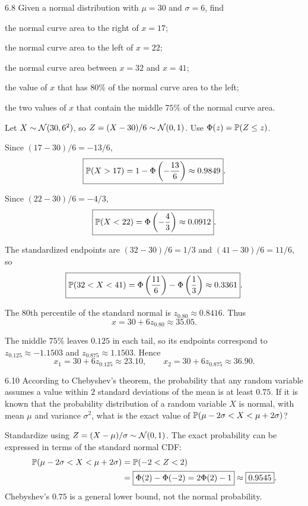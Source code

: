 \documentclass[11pt,oneside]{article}
\begin{document}
\begin{exercise}{6.8}
Given a normal distribution with $\mu=30$ and $\sigma=6$, find
\begin{exercisesubparts}
\item the normal curve area to the right of $x=17$;
\item the normal curve area to the left of $x=22$;
\item the normal curve area between $x=32$ and $x=41$;
\item the value of $x$ that has $80\%$ of the normal curve area to the left;
\item the two values of $x$ that contain the middle $75\%$ of the normal curve area.
\end{exercisesubparts}
\end{exercise}
\begin{solution}
Let $X\sim\mathcal{N}(30,6^2)$, so $Z=(X-30)/6\sim\mathcal{N}(0,1)$. Use $\Phi(z)=\mathbb{P}(Z\le z)$.
\begin{exercisesubparts}
\item Since $(17-30)/6=-13/6$,
\[
\boxed{\mathbb{P}(X>17)=1-\Phi\left(-\frac{13}{6}\right)\approx0.9849}.
\]
\item Since $(22-30)/6=-4/3$,
\[
\boxed{\mathbb{P}(X<22)=\Phi\left(-\frac43\right)\approx0.0912}.
\]
\item The standardized endpoints are $(32-30)/6=1/3$ and $(41-30)/6=11/6$, so
\[
\boxed{\mathbb{P}(32<X<41)=\Phi\left(\frac{11}{6}\right)-\Phi\left(\frac13\right)\approx0.3361}.
\]
\item The $80$th percentile of the standard normal is $z_{0.80}\approx0.8416$. Thus
\[
\boxed{x=30+6z_{0.80}\approx35.05}.
\]
\item The middle $75\%$ leaves $0.125$ in each tail, so its endpoints correspond to $z_{0.125}\approx-1.1503$ and $z_{0.875}\approx1.1503$. Hence
\[
\boxed{x_1=30+6z_{0.125}\approx23.10},\qquad
\boxed{x_2=30+6z_{0.875}\approx36.90}.
\]
\end{exercisesubparts}
\end{solution}

\begin{exercise}{6.10}
According to Chebyshev's theorem, the probability that any random variable assumes a value within $2$ standard deviations of the mean is at least $0.75$. If it is known that the probability distribution of a random variable $X$ is normal, with mean $\mu$ and variance $\sigma^2$, what is the exact value of $\mathbb{P}(\mu-2\sigma<X<\mu+2\sigma)$?
\end{exercise}
\begin{solution}
Standardize using $Z=(X-\mu)/\sigma\sim\mathcal{N}(0,1)$. The exact probability can be expressed in terms of the standard normal CDF:
\[
\begin{aligned}
\mathbb{P}(\mu-2\sigma<X<\mu+2\sigma)
 &=\mathbb{P}(-2<Z<2)\\
 &=\boxed{\Phi(2)-\Phi(-2)=2\Phi(2)-1}\approx\boxed{0.9545}.
\end{aligned}
\]
Chebyshev's $0.75$ is a general lower bound, not the normal probability.
\end{solution}
\end{document}
